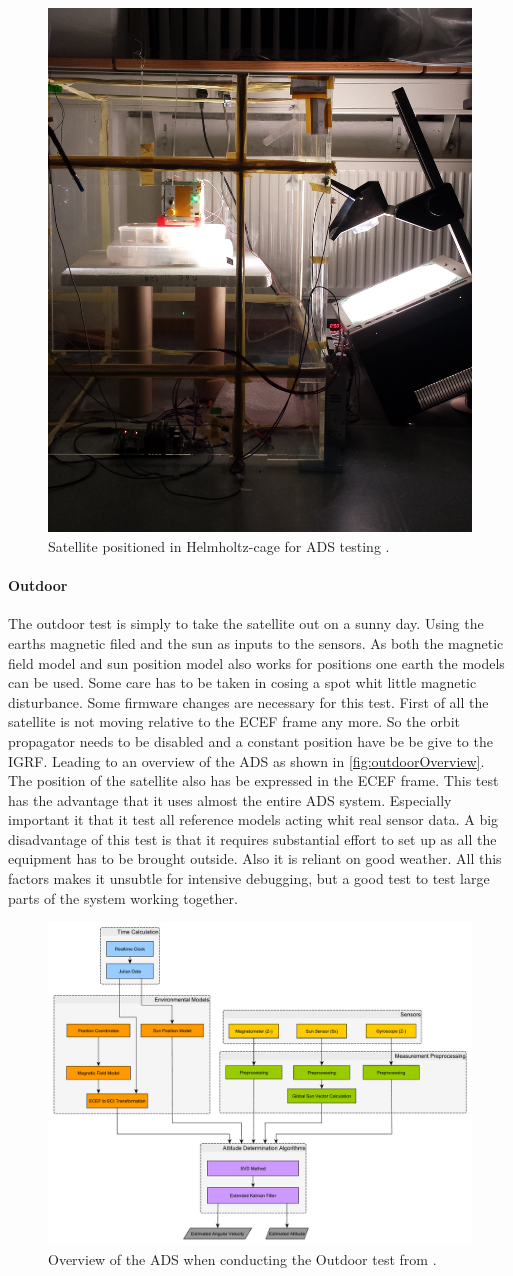\begin{figure}[tbp]
	\centering
	\includegraphics[width=0.3\columnwidth]{./Pictures/Helmholtz_night}
	\caption{Satellite positioned in Helmholtz-cage for ADS testing \cite{DavidThesis}.}
	\label{fig:Helmholtz-Cage}
\end{figure}               

\paragraph{Outdoor}
The outdoor test is simply to take the satellite out on a sunny day. Using the earths magnetic filed and the sun as inputs to the sensors. As both the magnetic field model and sun position model also works for positions one earth the models can be used. Some care has to be taken in cosing a spot whit little magnetic disturbance. Some firmware changes are necessary for this test. First of all the satellite is not moving relative to the ECEF frame any more. So the orbit propagator needs to be disabled and a constant position have be be give to the IGRF. Leading to an overview of the ADS as shown in \autoref{fig:outdoorOverview}. The position of the satellite also has be expressed in the ECEF frame. This test has the advantage that it uses almost the entire ADS system. Especially important it that it test all reference models acting whit real sensor data. A big disadvantage of this test is that it requires substantial effort to set up as all the equipment has to be brought outside. Also it is reliant on good weather. All this factors makes it unsubtle for intensive debugging, but a good test to test large parts of the system working together.         

\begin{figure}[tbp]
	\centering
	\includegraphics[width=0.5\columnwidth]{./Pictures/ATTDET_Architecture_O}
	\caption{Overview of the ADS when conducting the Outdoor test from \cite{DavidThesis}.}
	\label{fig:outrdoorOverview}
\end{figure}

